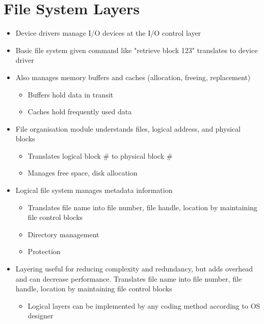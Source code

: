 \documentclass{article}[18pt]
\begin{document}
\section{File System Layers}
\begin{itemize}
	\item Device drivers manage I/O devices at the I/O control layer
	\item Basic file system given command like "retrieve block 123" translates to device driver
	\item Also manages memory buffers and caches (allocation, freeing, replacement)
	\begin{itemize}
		\item Buffers hold data in transit
		\item Caches hold frequently used data
	\end{itemize}
	\item File organisation module understands files, logical address, and physical blocks
	\begin{itemize}
		\item Translates logical block \# to physical block \#
		\item Manages free space, disk allocation
	\end{itemize}
	\item Logical file system manages metadata information
	\begin{itemize}
		\item Translates file name into file number, file handle, location by maintaining file control blocks
		\item Directory management
		\item Protection
	\end{itemize}
	\item Layering useful for reducing complexity and redundancy, but adds overhead and can decrease performance. Translates file name into file number, file handle, location by maintaining file control blocks
	\begin{itemize}
		\item Logical layers can be implemented by any coding method according to OS designer
	\end{itemize}
\end{itemize}
\end{document}
